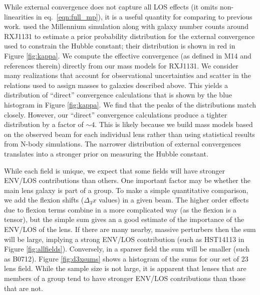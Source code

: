\documentclass{emulateapj}
\begin{document}
While external convergence does not capture all LOS effects (it omits non-linearities in eq.\ \ref{eqn:full_mp}), it is a useful quantity for comparing to previous work. \citet{Suyu13} used the Millennium simulation along with galaxy number counts around RXJ1131 to estimate a prior probability distribution for the external convergence used to constrain the Hubble constant; their distribution is shown in red in Figure \ref{fig:kappa}. We compute the effective convergence (as defined in M14 and references therein) directly from our mass models for RXJ1131.  We consider many realizations that account for observational uncertainties and scatter in the relations used to assign masses to galaxies described above.  This yields a distribution of ``direct'' convergence calculations that is shown by the blue histogram in Figure \ref{fig:kappa}. We find that the peaks of the distributions match closely. However, our ``direct'' convergence calculations produce a tighter distribution by a factor of $\sim 4$. This is likely because we build mass models based on the observed beam for each individual lens rather than using statistical results from N-body simulations. The narrower distribution of external convergences translates into a stronger prior on measuring the Hubble constant.


While each field is unique, we expect that some fields will have stronger ENV/LOS contributions than others. One important factor may be whether the main lens galaxy is part of a group. To make a simple quantitative comparison, we add the flexion shifts ($\Delta_3 x$ values) in a given beam. The higher order effects due to flexion terms combine in a more complicated way (as the flexion is a tensor), but the simple sum gives an a good estimate of the importance of the ENV/LOS of the lens. If there are many nearby, massive perturbers then the sum will be large, implying a strong ENV/LOS contribution (such as HST14113 in Figure \ref{fig:allfields}). Conversely, in a sparser field the sum will be smaller (such as B0712). Figure \ref{fig:d3xsums} shows a histogram of the sums for our set of 23 lens field. While the sample size is not large, it is apparent that lenses that are members of a group tend to have stronger ENV/LOS contributions than those that are not.
\end{document}
